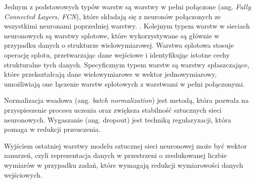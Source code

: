         Jednym z podstawowych typów warstw są warstwy w pełni połączone (ang. \textit{Fully Connected Layers, FCN}), które składają się z neuronów połączonych ze wszystkimi neuronami poprzedniej warstwy. \cite{Leksykon}. Kolejnym typem warstw w sieciach neuronowych są warstwy splotowe, które wykorzystywane są głównie w przypadku danych o strukturze wielowymiarowej. Warstwa splotowa stosuje operację splotu, przetwarzając dane wejściowe i identyfikując istotne cechy strukturalne tych danych\cite{LeCun:2015}. Specyficznym typem warstw są warstwy spłaszczające, które przekształcają dane wielowymiarowe w wektor jednowymiarowy, umożliwiają one łączenie warstw splotowych z warstwami w pełni połączonymi.

        Normalizacja wsadowa (ang. \textit{batch normalization}) jest metodą, która pozwala na przyspieszenie procesu uczenia oraz zwiększa stabilność sztucznych sieci neuronowych\cite{Ioffe:2015}. Wygaszanie (ang. dropout)\cite{Wan:2013} jest techniką regularyzacji, która pomaga w redukcji przeuczenia\cite{Leksykon}.

        Wyjściem ostatniej warstwy modelu sztucznej sieci neuronowej może być wektor zanurzeń, czyli reprezentacja danych w przestrzeni o zredukowanej liczbie wymiarów w przypadku zadań, które wymagają redukcji wymiarowości danych wejściowych.
